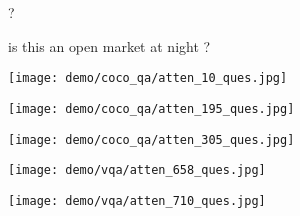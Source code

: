 \documentclass{article}
\def \fsize {1pt}
\begin{document}
\begin{figure}[tp]
\begin{minipage}{0.19\linewidth}
\begin{center}
{\textcolor[rgb]{0.0000,0.0000,0.7852}{?}
}
\end{center}
\end{minipage}
\begin{minipage}{0.19\linewidth}
\begin{center}
\tiny{
\setlength{\fboxsep}{\fsize}
\textcolor[rgb]{0.0000,0.0020,1.0000}{is}
\textcolor[rgb]{0.0000,0.1431,1.0000}{this}
\textcolor[rgb]{0.0000,0.3471,1.0000}{an}
\textcolor[rgb]{0.1992,1.0000,0.7685}{open}
\textcolor[rgb]{1.0000,0.7124,0.0000}{market}
\textcolor[rgb]{0.0000,0.2529,1.0000}{at}
\textcolor[rgb]{0.1992,1.0000,0.7685}{night}
\textcolor[rgb]{0.0000,0.0333,1.0000}{?}
}
\end{center}   
\end{minipage}

\begin{minipage}{0.19\linewidth}
\texttt{[image: demo/coco\_qa/atten\_10\_ques.jpg]}
\end{minipage}
\begin{minipage}{0.19\linewidth}
\texttt{[image: demo/coco\_qa/atten\_195\_ques.jpg]}
\end{minipage}
\begin{minipage}{0.19\linewidth}
\texttt{[image: demo/coco\_qa/atten\_305\_ques.jpg]}
\end{minipage}
\begin{minipage}{0.19\linewidth}
\texttt{[image: demo/vqa/atten\_658\_ques.jpg]}
\end{minipage}
\begin{minipage}{0.19\linewidth}
\texttt{[image: demo/vqa/atten\_710\_ques.jpg]}
\end{minipage}


\end{figure}
\end{document}
